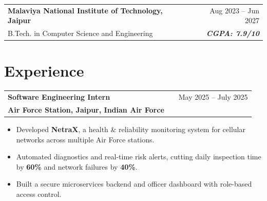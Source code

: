 \documentclass[a4paper,10pt]{article}
\begin{document}
\vspace{-2pt}

\begin{tabularx}{\linewidth}{ @{}l X r@{} }

\color[HTML]{1C033C} \textbf{Malaviya National Institute of Technology, Jaipur} & \hfill & \color[HTML]{371e77} Aug 2023 -- Jun 2027 \\

\color[HTML]{371e77} B.Tech. in Computer Science and Engineering & \hfill & \color[HTML]{4B28A4} \textit{\textbf{CGPA: 7.9/10}} \\

\end{tabularx}




\section{Experience}



\begin{tabularx}{\linewidth}{ @{}l X r@{} }

\textbf{Software Engineering Intern} & \hfill & \textcolor[HTML]{371e77}{May 2025 -- July 2025} \\

\textcolor[HTML]{371e77}{\textbf{Air Force Station, Jaipur, Indian Air Force}} & & \\

\end{tabularx}

\vspace{-8pt}

\begin{itemize}[nosep, leftmargin=1.5em, itemsep=0pt, topsep=0pt]

\item Developed \textbf{NetraX}, a health \& reliability monitoring system for cellular networks across multiple Air Force stations.

\item Automated diagnostics and real-time risk alerts, cutting daily inspection time by \textbf{60\%} and network failures by \textbf{40\%}.

\item Built a secure microservices backend and officer dashboard with role-based access control.

\end{itemize}
\end{document}
